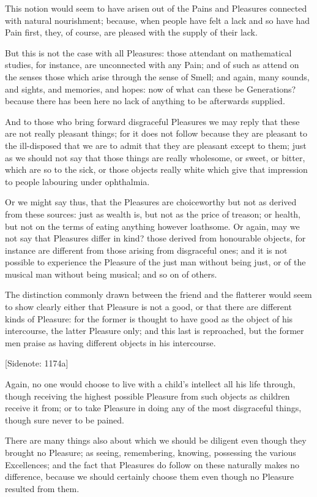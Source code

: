 This notion would seem to have arisen out of the Pains and Pleasures
connected with natural nourishment; because, when people have felt a
lack and so have had Pain first, they, of course, are pleased with the
supply of their lack.

But this is not the case with all Pleasures: those attendant on
mathematical studies, for instance, are unconnected with any Pain; and
of such as attend on the senses those which arise through the sense of
Smell; and again, many sounds, and sights, and memories, and hopes: now
of what can these be Generations? because there has been here no lack of
anything to be afterwards supplied.

And to those who bring forward disgraceful Pleasures we may reply that
these are not really pleasant things; for it does not follow because
they are pleasant to the ill-disposed that we are to admit that they are
pleasant except to them; just as we should not say that those things
are really wholesome, or sweet, or bitter, which are so to the sick,
or those objects really white which give that impression to people
labouring under ophthalmia.

Or we might say thus, that the Pleasures are choiceworthy but not as
derived from these sources: just as wealth is, but not as the price of
treason; or health, but not on the terms of eating anything however
loathsome. Or again, may we not say that Pleasures differ in kind? those
derived from honourable objects, for instance are different from those
arising from disgraceful ones; and it is not possible to experience
the Pleasure of the just man without being just, or of the musical man
without being musical; and so on of others.

The distinction commonly drawn between the friend and the flatterer
would seem to show clearly either that Pleasure is not a good, or that
there are different kinds of Pleasure: for the former is thought to have
good as the object of his intercourse, the latter Pleasure only; and
this last is reproached, but the former men praise as having different
objects in his intercourse.

[Sidenote: 1174a]

Again, no one would choose to live with a child's intellect all his
life through, though receiving the highest possible Pleasure from such
objects as children receive it from; or to take Pleasure in doing any of
the most disgraceful things, though sure never to be pained.

There are many things also about which we should be diligent even though
they brought no Pleasure; as seeing, remembering, knowing, possessing
the various Excellences; and the fact that Pleasures do follow on these
naturally makes no difference, because we should certainly choose them
even though no Pleasure resulted from them.

